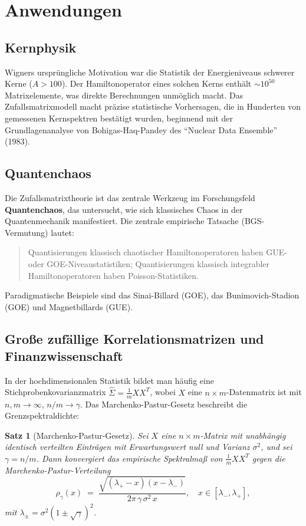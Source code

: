 \documentclass[12pt,a4paper]{amsart}
\newtheorem{theorem}{Satz}[section]
\theoremstyle{definition}
\theoremstyle{remark}
\begin{document}
\section{Anwendungen}
\label{sec:anwendungen}

\subsection{Kernphysik}

Wigners ursprüngliche Motivation war die Statistik der Energieniveaus schwerer
Kerne ($A > 100$). Der Hamiltonoperator eines solchen Kerns enthält
$\sim 10^{50}$ Matrixelemente, was direkte Berechnungen unmöglich macht.
Das Zufallsmatrixmodell macht präzise statistische Vorhersagen, die in
Hunderten von gemessenen Kernspektren bestätigt wurden, beginnend mit der
Grundlagenanalyse von Bohigas-Haq-Pandey des ``Nuclear Data Ensemble'' (1983).

\subsection{Quantenchaos}

Die Zufallsmatrixtheorie ist das zentrale Werkzeug im Forschungsfeld
\textbf{Quantenchaos}, das untersucht, wie sich klassisches Chaos in der
Quantenmechanik manifestiert. Die zentrale empirische Tatsache
(BGS-Vermutung) lautet:
\begin{quote}
  Quantisierungen klassisch chaotischer Hamiltonoperatoren haben GUE- oder GOE-Niveaustatistiken;
  Quantisierungen klassisch integrabler Hamiltonoperatoren haben Poisson-Statistiken.
\end{quote}
Paradigmatische Beispiele sind das Sinai-Billard (GOE), das Bunimovich-Stadion (GOE)
und Magnetbillards (GUE).

\subsection{Große zufällige Korrelationsmatrizen und Finanzwissenschaft}

In der hochdimensionalen Statistik bildet man häufig eine Stichprobenkovarianzmatrix
$\hat{\Sigma} = \frac{1}{m} X X^T$, wobei $X$ eine $n \times m$-Datenmatrix ist
mit $n, m \to \infty$, $n/m \to \gamma$. Das Marchenko-Pastur-Gesetz
\cite{MarchenkoPastur1967} beschreibt die Grenzspektraldichte:

\begin{theorem}[Marchenko-Pastur-Gesetz]
\label{thm:marchenkopastur}
Sei $X$ eine $n \times m$-Matrix mit unabhängig identisch verteilten Einträgen
mit Erwartungswert null und Varianz $\sigma^2$, und sei $\gamma = n/m$. Dann
konvergiert das empirische Spektralmaß von $\frac{1}{m} X X^T$ gegen die
Marchenko-Pastur-Verteilung
\[
  \rho_{\gamma}(x)
  \;=\; \frac{\sqrt{(\lambda_+ - x)(x - \lambda_-)}}{2\pi\,\gamma\,\sigma^2\,x},
  \quad x \in [\lambda_-, \lambda_+],
\]
mit $\lambda_{\pm} = \sigma^2(1 \pm \sqrt{\gamma})^2$.
\end{theorem}
\end{document}
